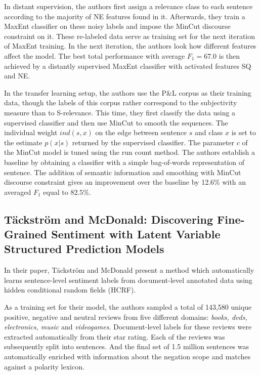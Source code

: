 \documentclass[a4paper,11pt]{article}
\begin{document}
In distant supervision, the authors first assign a relevance class to
each sentence according to the majority of NE features found in it.
Afterwards, they train a MaxEnt classifier on these noisy labels and
impose the MinCut discourse constraint on it.  These re-labeled data
serve as training set for the next iteration of MaxEnt training.  In
the next iteration, the authors look how different features affect the
model.  The best total performance with average $F_1 = 67.0$ is then
achieved by a distantly supervised MaxEnt classifier with activated
features SQ and NE.

In the transfer learning setup, the authors use the P\&L corpus as
their training data, though the labels of this corpus rather
correspond to the subjectivity measure than to S-relevance.  This
time, they first classify the data using a supervised classifier and
then use MinCut to smooth the sequences.  The individual weight
$ind(s,x)$ on the edge between sentence $s$ and class $x$ is set to
the estimate $p(x|s)$ returned by the supervised classifier.  The
parameter $c$ of the MinCut model is tuned using the run count method.
The authors establish a baseline by obtaining a classifier with a
simple bag-of-words representation of sentence.  The addition of
semantic information and smoothing with MinCut discourse constraint
gives an improvement over the baseline by 12.6\% with an averaged
$F_1$ equal to $82.5\%$.

\subsection{T\"ackstr\"om and McDonald: Discovering Fine-Grained Sentiment with Latent Variable
                  Structured Prediction Models \cite{Tackstrom-11}}

In their paper, T\"ackstr\"om and McDonald present a method which
automatically learns sentence-level sentiment labels from document-level
annotated data using hidden conditional random fields (HCRF).

As a training set for their model, the authors sampled a total of 143,580
unique positive, negative and neutral reviews from five different domains:
\textit{books, dvds, electronics, music} and \textit{videogames}.
Document-level labels for these reviews were extracted automatically from
their star rating.  Each of the reviews was subsequently split into sentences.
And the final set of 1.5 million sentences was automatically enriched with
information about the negation scope and matches against a polarity lexicon.
\end{document}
